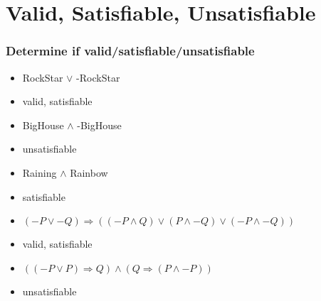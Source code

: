 \documentclass[compress, 9pt]{beamer}
\begin{document}
\section{Valid, Satisfiable, Unsatisfiable}
\label{sec-2}
\begin{frame}
\frametitle{Determine if valid/satisfiable/unsatisfiable}
\label{sec-2-1}

\begin{itemize}
\item <1-> RockStar $\vee$ -RockStar
\item <2-> valid, satisfiable
\item <3-> BigHouse $\wedge$ -BigHouse
\item <4-> unsatisfiable
\item <5-> Raining $\wedge$ Rainbow
\item <6-> satisfiable
\item <7-> $(-P \vee -Q) \Rightarrow ((-P \wedge Q) \vee (P \wedge -Q) \vee
  (-P \wedge -Q))$
\item <8-> valid, satisfiable
\item <9-> $((-P \vee P) \Rightarrow Q) \wedge (Q \Rightarrow (P \wedge
  -P))$
\item <10-> unsatisfiable
\end{itemize}
\end{frame}
\end{document}
